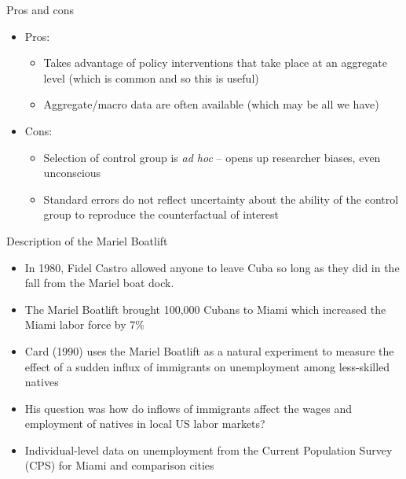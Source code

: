 \documentclass{beamer}
\begin{document}
\begin{frame}{Pros and cons}
	
	\begin{itemize}
	\item Pros:
		\begin{itemize}
		\item Takes advantage of policy interventions that take place at an aggregate level (which is common and so this is useful)
		\item Aggregate/macro data are often available (which may be all we have)
		\end{itemize}
	\item Cons:
		\begin{itemize}
		\item Selection of control group is \emph{ad hoc} -- opens up researcher biases, even unconscious
		\item Standard errors do not reflect uncertainty about the ability of the control group to reproduce the counterfactual of interest
		\end{itemize}
	\end{itemize}
\end{frame}

\begin{frame}{Description of the Mariel Boatlift}
	
	\begin{itemize}
	\item In 1980, Fidel Castro allowed anyone to leave Cuba so long as they did in the fall from the Mariel boat dock.
	\item The Mariel Boatlift brought 100,000 Cubans to Miami which increased the Miami labor force by 7\%
	\item Card (1990) uses the Mariel Boatlift as a natural experiment to measure the effect of a sudden influx of immigrants on unemployment among less-skilled natives
	\item His question was how do inflows of immigrants affect the wages and employment of natives in local US labor markets?
	\item Individual-level data on unemployment from the Current Population Survey (CPS) for Miami and comparison cities
	\end{itemize}
\end{frame}
\end{document}
